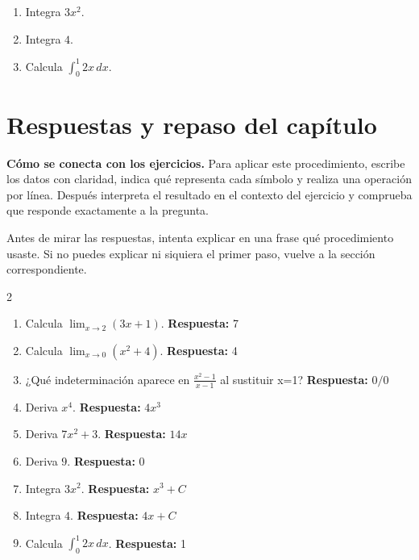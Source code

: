 \documentclass[10pt,oneside,openany]{book}
\begin{document}
\begin{practica}

\begin{enumerate}

\item Integra $3x^2$.

\item Integra $4$.

\item Calcula $\int_0^1 2x\,dx$.

\end{enumerate}

\end{practica}



\section{Respuestas y repaso del capítulo}

\textbf{Cómo se conecta con los ejercicios.} Para aplicar este procedimiento, escribe los datos con claridad, indica qué representa cada símbolo y realiza una operación por línea. Después interpreta el resultado en el contexto del ejercicio y comprueba que responde exactamente a la pregunta.

Antes de mirar las respuestas, intenta explicar en una frase qué procedimiento usaste. Si no puedes explicar ni siquiera el primer paso, vuelve a la sección correspondiente.

\begin{multicols}{2}\begin{enumerate}

\item Calcula $\lim_{x\to2}(3x+1)$. \textbf{Respuesta:} 7

\item Calcula $\lim_{x\to0}(x^2+4)$. \textbf{Respuesta:} 4

\item ¿Qué indeterminación aparece en $\frac{x^2-1}{x-1}$ al sustituir x=1? \textbf{Respuesta:} $0/0$

\item Deriva $x^4$. \textbf{Respuesta:} $4x^3$

\item Deriva $7x^2+3$. \textbf{Respuesta:} $14x$

\item Deriva $9$. \textbf{Respuesta:} 0

\item Integra $3x^2$. \textbf{Respuesta:} $x^3+C$

\item Integra $4$. \textbf{Respuesta:} $4x+C$

\item Calcula $\int_0^1 2x\,dx$. \textbf{Respuesta:} 1

\end{enumerate}\end{multicols}
\end{document}
